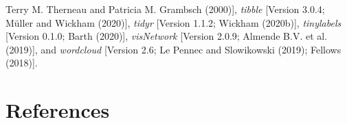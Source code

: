 \documentclass[
  american,
  man]{apa7}
\begin{document}
Terry M. Therneau and Patricia M. Grambsch (2000){]}, \emph{tibble} {[}Version 3.0.4; Müller and Wickham (2020){]}, \emph{tidyr} {[}Version 1.1.2; Wickham (2020b){]}, \emph{tinylabels} {[}Version 0.1.0; Barth (2020){]}, \emph{visNetwork} {[}Version 2.0.9; Almende B.V. et al. (2019){]}, and \emph{wordcloud} {[}Version 2.6; Le Pennec and Slowikowski (2019); Fellows (2018){]}.

\newpage

\hypertarget{references}{%
\section{References}\label{references}}

\begingroup
\setlength{\parindent}{-0.5in}
\setlength{\leftskip}{0.5in}

\hypertarget{refs}{}
\end{document}
